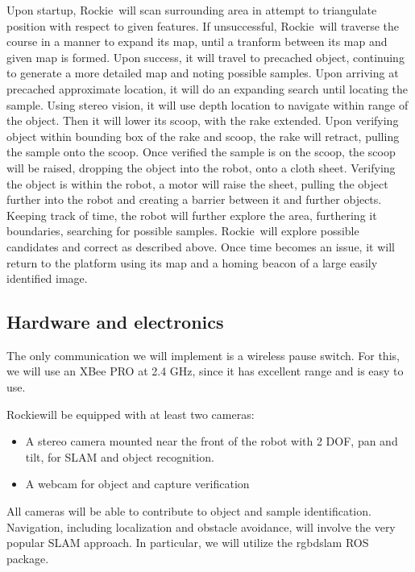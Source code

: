 \documentclass{paper}
\newcommand \robotName{Rockie} 		%
\begin{document}
	Upon startup, \robotName \ will scan surrounding area in attempt to triangulate position with respect to given features.  If unsuccessful, \robotName \ will traverse the course in a manner to expand its map, until a tranform between its map and given map is formed.  Upon success, it will travel to precached object, continuing to generate a more detailed map and noting possible samples.  Upon arriving at precached approximate location, it will do an expanding search until locating the sample.  Using stereo vision, it will use depth location to navigate within range of the object.  Then it will lower its scoop, with the rake extended.  Upon verifying object within bounding box of the rake and scoop, the rake will retract, pulling the sample onto the scoop.  Once verified the sample is on the scoop, the scoop will be raised, dropping the object into the robot, onto a cloth sheet.  Verifying the object is within the robot, a motor will raise the sheet, pulling the object further into the robot and creating a barrier between it and further objects.  Keeping track of time, the robot will further explore the area, furthering it boundaries, searching for possible samples.  \robotName \ will explore possible candidates and correct as described above.  Once time becomes an issue, it will return to the platform using its map and a homing beacon of a large easily identified image. 

\subsection*{Hardware and electronics}

	The only communication we will implement is a wireless pause switch.  For this, we will use an XBee PRO at 2.4 GHz, since it has excellent range and is easy to use.

	\robotName\text{ }will be equipped with at least two cameras: 
\begin{itemize}
	\item A stereo camera mounted near the front of the robot with 2 DOF, pan and tilt, for SLAM and object recognition.
	\item A webcam for object and capture verification
\end{itemize}
All cameras will be able to contribute to object and sample identification.  
	Navigation, including localization and obstacle avoidance, will involve the very popular SLAM approach.  In particular, we will utilize the rgbdslam ROS package.  
\end{document}
